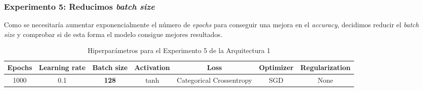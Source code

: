 \documentclass{article}
\begin{document}
		\subsubsection{Experimento 5: Reducimos \textit{batch size}}
		\label{d-s-a1-e5}
			Como se necesitar\'ia aumentar exponencialmente el n\'umero de \textit{epochs} para conseguir una mejora en el \textit{accuracy}, decidimos reducir el \textit{batch size} y comprobar si de esta forma el modelo consigue mejores resultados.
			\begin{table}[!h]
				\begin{center}
					\begin{tabular}{| c | c | c | c | c | c | c |}
						\textbf{Epochs} & \textbf{Learning rate} & \textbf{Batch size} & \textbf{Activation} & \textbf{Loss} & \textbf{Optimizer} & \textbf{Regularization} \\ \hline
						1000 & 0.1 & \textbf{128} & tanh & Categorical Crossentropy & SGD & None
					\end{tabular}
					\caption{Hiperpar\'ametros para el Experimento 5 de la Arquitectura 1}
					\label{tab:hip-d-a1-e5}
				\end{center}
			\end{table}
\end{document}
